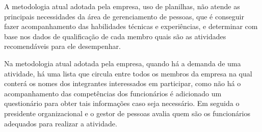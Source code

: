 A metodologia atual adotada pela empresa, uso de planilhas,  não atende as principais necessidades  da área de gerenciamento de pessoas, que é conseguir fazer acompanhamento das habilidades técnicas e experiências, e determinar com base nos dados de qualificação de cada membro quais são as atividades recomendáveis para ele desempenhar.

Na metodologia atual adotada pela empresa, quando há a demanda de uma atividade, há uma lista que circula entre todos os membros da empresa na qual conterá os nomes dos integrantes interessados em participar, como não há o acompanhamento das competências dos funcionários é adicionado um questionário para obter tais informações caso seja necessário. Em seguida o presidente organizacional e o gestor de pessoas avalia quem são os funcionários adequados para realizar a atividade. 

